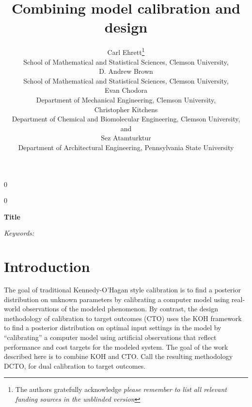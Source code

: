 \documentclass[12pt]{article}
\date{}
\newcommand{\blind}{0}
\begin{document}
%

\def\spacingset#1{\renewcommand{\baselinestretch}%
{#1}\small\normalsize} \spacingset{1}



\blind
{
  \title{\bf Combining model calibration and design}
  \author{Carl Ehrett\thanks{
    The authors gratefully acknowledge \textit{please remember to list all relevant funding sources in the unblinded version}}\hspace{.2cm}\\
    School of Mathematical and Statistical Sciences, Clemson University,\\
    D. Andrew Brown \\
    School of Mathematical and Statistical Sciences, Clemson University,\\
    Evan Chodora \\
    Department of Mechanical Engineering, Clemson University,\\
    Christopher Kitchens \\
    Department of Chemical and Biomolecular Engineering, Clemson University,\\
    and \\
    Sez Atamturktur \\
    Department of Architectural Engineering, Pennsylvania State University\\}
  \maketitle
} \fi

\blind
{
  \bigskip
  \bigskip
  \bigskip
  \begin{center}
    {\LARGE\bf Title}
\end{center}
  \medskip
} \fi

\bigskip

\noindent%
{\it Keywords:}  
\vfill

\newpage
\spacingset{2} %
\section{Introduction}
\label{introduction}

%
The goal of traditional Kennedy-O'Hagan style calibration \citep[KOH, ][]{kennedy2001} is to find a posterior distribution on unknown parameters by calibrating a computer model using real-world observations of the modeled phenomenon.
%
By contrast, the design methodology of calibration to target outcomes (CTO) uses the KOH framework to find a posterior distribution on optimal input settings in the model by ``calibrating'' a computer model using artificial observations that reflect performance and cost targets for the modeled system.
%
The goal of the work described here is to combine KOH and CTO.
%
Call the resulting methodology DCTO, for dual calibration to target outcomes.
\end{document}
